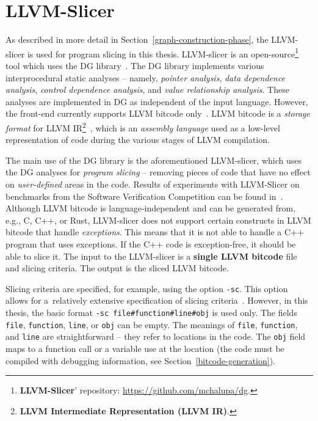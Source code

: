 \section{LLVM-Slicer}
\label{slicer}
As described in more detail in Section~\ref{graph-construction-phase}, the LLVM-slicer is used for program slicing in this thesis. LLVM-slicer is an open-source\footnote{\textbf{LLVM-Slicer}' repository: \url{https://github.com/mchalupa/dg}.} tool which uses the DG library~\cite{DG-2-chalupa2020dg, DG-chalupa2020dg}. The DG library implements various interprocedural static analyses -- namely, \textit{pointer analysis}, \textit{data dependence analysis}, \textit{control dependence analysis}, and \textit{value relationship analysis}. These analyses are implemented in DG as independent of the input language. However, the front-end currently supports LLVM bitcode only~\cite{LLVM-bitcode}. LLVM bitcode is a \textit{storage format} for LLVM IR\footnote{\textbf{LLVM Intermediate Representation (LLVM IR)}.}~\cite{LLVM-IR}, which is an \textit{assembly language} used as a low-level representation of code during the various stages of LLVM compilation.

The main use of the DG library is the aforementioned LLVM-slicer, which uses the DG analyses for \textit{program slicing} -- removing pieces of code that have no effect on \textit{user-defined} areas in the code. Results of experiments with LLVM-Slicer on benchmarks from the Software Verification Competition can be found in~\cite{DG-chalupa2020dg}. Although LLVM bitcode is language-independent and can be generated from, e.g., C, C++, or Rust, LLVM-slicer does not support certain constructs in LLVM bitcode that handle \textit{exceptions}. This means that it is not able to handle a C++ program that uses exceptions. If the C++ code is exception-free, it should be able to slice it. The input to the LLVM-slicer is a \textbf{single LLVM bitcode} file and slicing criteria. The output is the sliced LLVM bitcode.

Slicing criteria are specified, for example, using the option \texttt{-sc}. This option allows for a~relatively extensive specification of slicing criteria~\cite{llvm-slicer-readme}. However, in this thesis, the basic format \texttt{-sc file\#function\#line\#obj} is used only. The fields \texttt{file}, \texttt{function}, \texttt{line}, or \texttt{obj} can be empty. The meanings of \texttt{file}, \texttt{function}, and \texttt{line} are straightforward -- they refer to locations in the code. The \texttt{obj} field maps to a function call or a variable use at the location (the code must be compiled with debugging information, see Section~\ref{bitcode-generation}).

